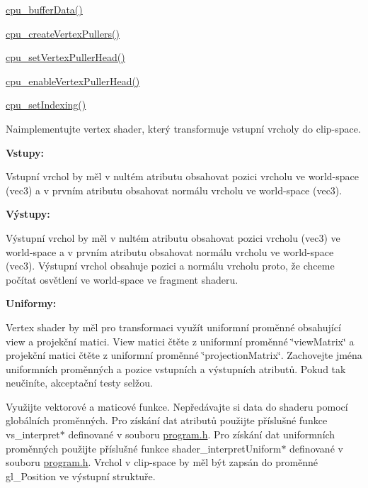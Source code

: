 \begin{DoxyRefList}
\begin{DoxyItemize}
\item \hyperlink{buffer_8h_aad292278b58c11db74df3cb3e3a52f22}{cpu\-\_\-buffer\-Data()}
\item \hyperlink{vertexPuller_8h_a3b9678475f48f09c3ddbd4316fce3e08}{cpu\-\_\-create\-Vertex\-Pullers()}
\item \hyperlink{vertexPuller_8h_a07be46ae38b8ec80ec85581a33b02786}{cpu\-\_\-set\-Vertex\-Puller\-Head()}
\item \hyperlink{vertexPuller_8h_afc4c70416bc0e515e75ec90c8c8d1584}{cpu\-\_\-enable\-Vertex\-Puller\-Head()}
\item \hyperlink{vertexPuller_8h_aa312eaf555d453ead6a430f8f058c9a6}{cpu\-\_\-set\-Indexing()}  
\end{DoxyItemize}
\item[\label{todo__todo000008}%
\hypertarget{todo__todo000008}{}%
Global \hyperlink{group__shader__side_gabf238d989258c2c2e8e807e42e1c1404}{phong\-\_\-vertex\-Shader} (\hyperlink{structGPUVertexShaderOutput}{G\-P\-U\-Vertex\-Shader\-Output} $\ast$const output, \hyperlink{structGPUVertexShaderInput}{G\-P\-U\-Vertex\-Shader\-Input} const $\ast$const input, G\-P\-U const gpu)]Naimplementujte vertex shader, který transformuje vstupní vrcholy do clip-\/space.\par
 {\bfseries Vstupy\-:}\par
 Vstupní vrchol by měl v nultém atributu obsahovat pozici vrcholu ve world-\/space (vec3) a v prvním atributu obsahovat normálu vrcholu ve world-\/space (vec3).\par
 {\bfseries Výstupy\-:}\par
 Výstupní vrchol by měl v nultém atributu obsahovat pozici vrcholu (vec3) ve world-\/space a v prvním atributu obsahovat normálu vrcholu ve world-\/space (vec3). Výstupní vrchol obsahuje pozici a normálu vrcholu proto, že chceme počítat osvětlení ve world-\/space ve fragment shaderu.\par
 {\bfseries Uniformy\-:}\par
 Vertex shader by měl pro transformaci využít uniformní proměnné obsahující view a projekční matici. View matici čtěte z uniformní proměnné \char`\"{}view\-Matrix\char`\"{} a projekční matici čtěte z uniformní proměnné \char`\"{}projection\-Matrix\char`\"{}. Zachovejte jména uniformních proměnných a pozice vstupních a výstupních atributů. Pokud tak neučiníte, akceptační testy selžou.\par
 \par
 Využijte vektorové a maticové funkce. Nepředávajte si data do shaderu pomocí globálních proměnných. Pro získání dat atributů použijte příslušné funkce vs\-\_\-interpret$\ast$ definované v souboru \hyperlink{program_8h}{program.\-h}. Pro získání dat uniformních proměnných použijte příslušné funkce shader\-\_\-interpret\-Uniform$\ast$ definované v souboru \hyperlink{program_8h}{program.\-h}. Vrchol v clip-\/space by měl být zapsán do proměnné gl\-\_\-\-Position ve výstupní struktuře.\par

\end{DoxyRefList}
